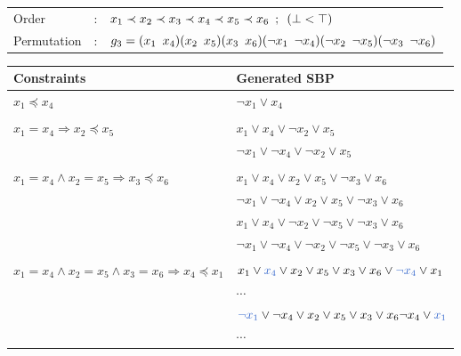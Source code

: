 \begin{center}
	\begin{tabular}{lll}
		Order &:& $ x_1 \prec x_2 \prec x_3 \prec x_4 \prec x_5 \prec x_6 \enskip ; \enskip  (\bot < \top)$ \\
		Permutation &:& $g_3 = (x_1 \enskip x_4)(x_2 \enskip x_5)(x_3 \enskip x_6)(\neg x_1 \enskip \neg x_4)(\neg x_2 \enskip \neg x_5)(\neg x_3 \enskip \neg x_6)$
	\end{tabular}
	
	\vspace*{2\baselineskip}
	
	\begin{tabular}{ll}
		Constraints & Generated SBP\\
		\midrule
		$x_1 \preceq x_4$ & $ \neg x_1 \lor x_4$ \\
		&\\
		$x_1 = x_4 \Rightarrow x_2 \preceq x_5$ & $ x_1 \lor x_4 \lor \neg x_2 \lor x_5$\\
		&$ \neg x_1 \lor \neg x_4 \lor \neg x_2 \lor x_5$\\
		&\\
		$x_1 = x_4 \land x_2 = x_5 \Rightarrow x_3 \preceq x_6$ &
		  $ x_1 \lor x_4 \lor x_2 \lor x_5 \lor \neg x_3 \lor x_6$ \\
		& $ \neg x_1 \lor \neg x_4 \lor x_2 \lor x_5 \lor \neg x_3 \lor x_6$ \\
		& $ x_1 \lor x_4 \lor \neg x_2 \lor \neg x_5 \lor \neg x_3 \lor x_6$ \\
		& $ \neg x_1 \lor \neg x_4 \lor \neg x_2 \lor \neg x_5 \lor \neg x_3 \lor x_6$ \\ 
		&\\
		  $x_1 = x_4 \land x_2 = x_5 \land x_3 = x_6 \Rightarrow x_4 \preceq x_1$ &
		  $ x_1 \lor \textcolor{blue_1}{x_4} \lor x_2 \lor x_5 \lor  x_3 \lor x_6 \lor \textcolor{blue_1}{\neg x_4} \lor x_1$\\
		& $\cdots$ \\
		& $ \textcolor{blue_1}{\neg x_1} \lor \neg x_4 \lor  x_2 \lor x_5 \lor x_3 \lor x_6 \neg x_4 \lor \textcolor{blue_1}{x_1}$ \\ 
     	& $\cdots$ \\
	\end{tabular}
\end{center}





%
